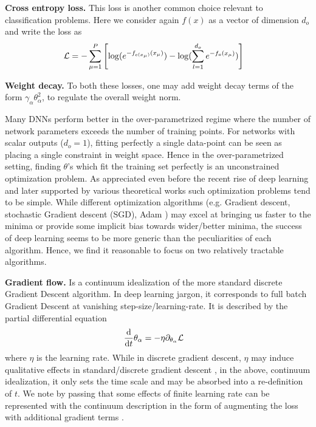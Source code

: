 {\bf Cross entropy loss.} This loss is another common choice relevant to classification problems. Here we consider again $f(x)$ as a vector of dimension $d_o$ and write the loss as  
\begin{align}
\mathcal{L} &= -\sum_{\mu=1}^P \left[\log(e^{-f_{c(x_{\mu})}(x_{\mu})})-\log(\sum_{l=1}^{d_o} e^{-f_o(x_{\mu})})\right]
\end{align}

{\bf Weight decay.} To both these losses, one may add weight decay terms of the form $\gamma_{\alpha}\theta^2_{\alpha}$, to regulate the overall weight norm. 

Many DNNs perform better in the over-parametrized regime where the number of network parameters exceeds the number of training points. For networks with scalar outputs ($d_o=1$), fitting perfectly a single data-point can be seen as placing a single constraint in weight space. Hence in the over-parametrized setting, finding $\theta$'s which fit the training set perfectly is an unconstrained optimization problem. As appreciated even before the recent rise of deep learning \citep{Breiman2018ReflectionsAR} and later supported by various theoretical works  \citep{Dauphin2014,Choromanska2014,Jacot2018} such optimization problems tend to be simple. While different optimization algorithms (e.g. Gradient descent, stochastic Gradient descent (SGD), Adam \cite{kingma2017adammethodstochasticoptimization}) may excel at bringing us faster to the minima or provide some implicit bias towards wider/better minima, the success of deep learning seems to be more generic than the peculiarities of each algorithm. Hence, we find it reasonable to focus on two relatively tractable algorithms.

{\bf Gradient flow.} Is a continuum idealization of the more standard discrete Gradient Descent algorithm. In deep learning jargon, it corresponds to full batch Gradient Descent at vanishing step-size/learning-rate. It is described by the partial differential equation 
\begin{align}
\frac{\text{d}}{\text{d} t} \theta_{\alpha}&= -\eta\partial_{\theta_{\alpha}} \mathcal{L}
\end{align}
where $\eta$ is the learning rate. While in discrete gradient descent, $\eta$ may induce qualitative effects in standard/discrete gradient descent \citep{lewkowycz2020large}, in the above, continuum idealization, it only sets the time scale and may be absorbed into a re-definition of $t$. We note by passing that some effects of finite learning rate can be represented with the continuum description in the form of augmenting the loss with additional gradient terms \citep{Barrett2020,Smith2021}. 

